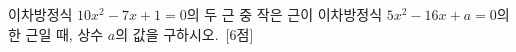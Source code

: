 이차방정식 $10x^2-7x+1=0$의 두 근 중 작은 근이 이차방정식 $5x^2-16x+a=0$의 한 근일 때, 상수 $a$의 값을 구하시오.~\mbox{\mbox{[6점]}}
